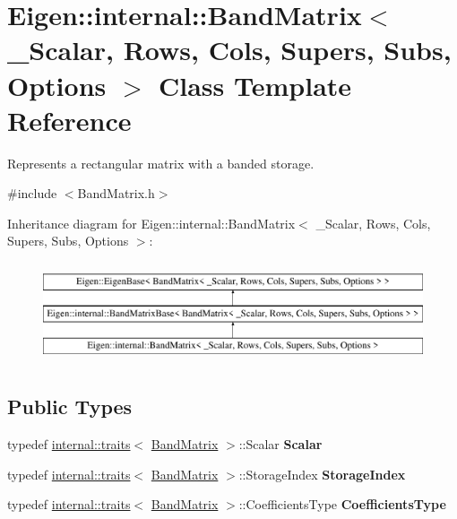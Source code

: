 \hypertarget{class_eigen_1_1internal_1_1_band_matrix}{}\section{Eigen\+::internal\+::Band\+Matrix$<$ \+\_\+\+Scalar, Rows, Cols, Supers, Subs, Options $>$ Class Template Reference}
\label{class_eigen_1_1internal_1_1_band_matrix}


Represents a rectangular matrix with a banded storage.  




{\ttfamily \#include $<$Band\+Matrix.\+h$>$}

Inheritance diagram for Eigen\+::internal\+::Band\+Matrix$<$ \+\_\+\+Scalar, Rows, Cols, Supers, Subs, Options $>$\+:\begin{figure}[H]
\begin{center}
\leavevmode
\includegraphics[height=2.973451cm]{class_eigen_1_1internal_1_1_band_matrix}
\end{center}
\end{figure}
\subsection*{Public Types}
\begin{DoxyCompactItemize}
\item 
\mbox{\label{class_eigen_1_1internal_1_1_band_matrix_a18a3abc017e0a0e706e5765ccdb155e3}} 
typedef \mbox{\hyperlink{struct_eigen_1_1internal_1_1traits}{internal\+::traits}}$<$ \mbox{\hyperlink{class_eigen_1_1internal_1_1_band_matrix}{Band\+Matrix}} $>$\+::Scalar {\bfseries Scalar}
\item 
\mbox{\label{class_eigen_1_1internal_1_1_band_matrix_a1b89828b6577877ee8bc2a4ffbcc1f06}} 
typedef \mbox{\hyperlink{struct_eigen_1_1internal_1_1traits}{internal\+::traits}}$<$ \mbox{\hyperlink{class_eigen_1_1internal_1_1_band_matrix}{Band\+Matrix}} $>$\+::Storage\+Index {\bfseries Storage\+Index}
\item 
\mbox{\label{class_eigen_1_1internal_1_1_band_matrix_a55bf1a3acc0e0b3c4a9a8b1ddad631cd}} 
typedef \mbox{\hyperlink{struct_eigen_1_1internal_1_1traits}{internal\+::traits}}$<$ \mbox{\hyperlink{class_eigen_1_1internal_1_1_band_matrix}{Band\+Matrix}} $>$\+::Coefficients\+Type {\bfseries Coefficients\+Type}
\end{DoxyCompactItemize}
